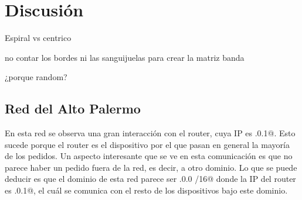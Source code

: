 \section{Discusi\'on}

Espiral vs centrico

no contar los bordes ni las sanguijuelas para crear la matriz banda

¿porque random?


\subsection{Red del Alto Palermo}

En esta red se observa una gran interacci\'on con el router, cuya IP es .0.1@. Esto 
sucede porque el router es el dispositivo por el que pasan en general la mayor\'ia de los pedidos.
Un aspecto interesante que se ve en esta comunicaci\'on es que no parece haber un pedido fuera de
la red, es decir, a otro dominio. Lo que se puede deducir es que el dominio de esta red parece ser 
.0.0 /16@ donde la IP del router es .0.1@, el cu\'al se comunica con el
resto de los dispositivos bajo este dominio.




